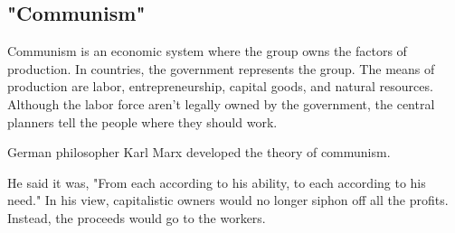 \documentclass[]{article}
\begin{document}
\subsection{"Communism"}
Communism is an economic system where the group owns the factors of production. In countries, the government represents the group. The means of production are labor, entrepreneurship, capital goods, and natural resources. Although the labor force aren't legally owned by the government, the central planners tell the people where they should work.

German philosopher Karl Marx developed the theory of communism.

He said it was, "From each according to his ability, to each according to his need." In his view, capitalistic owners would no longer siphon off all the profits. Instead, the proceeds would go to the workers.
\end{document}
